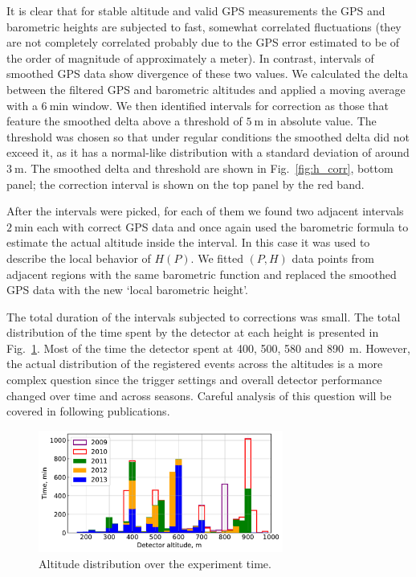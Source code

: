 \documentclass[universe,article,submit,moreauthors,pdftex]{Definitions/mdpi}
\begin{document}
It is clear that for stable altitude and valid GPS measurements the GPS and barometric heights are subjected to fast, somewhat correlated fluctuations (they are not completely correlated probably due to the GPS error estimated to be of the order of magnitude of approximately a meter). In contrast, intervals of smoothed GPS data show divergence of these two values. We calculated the delta between the filtered GPS and barometric altitudes and applied a moving average with a $6~\textrm{min}$ window. We then identified intervals for correction as those that feature the smoothed delta above a threshold of $5~\textrm{m}$ in absolute value. The threshold was chosen so that  under regular conditions the smoothed delta did not exceed it, as it has a normal-like distribution with a standard deviation of around $3~\textrm{m}$. The smoothed delta and threshold are shown in Fig.~\ref{fig:h_corr}, bottom panel; the correction interval is shown on the top panel by the red band.

After the intervals were picked, for each of them we found two adjacent intervals $2~\textrm{min}$ each with correct GPS data and once again used the barometric formula to estimate the actual altitude inside the interval. In this case it was used to describe the local behavior of $H(P)$. We fitted $(P, H)$ data points from adjacent regions with the same barometric function and replaced the smoothed GPS data with the new `local barometric height'.

The total duration of the intervals subjected to corrections was small. The total distribution of the time spent by the detector at each height is presented in Fig.~\ref{fig:time_on_altitude}. Most of the time the detector spent at 400, 500, 580 and 890~m. However, the actual distribution of the registered events across the altitudes is a more complex question since the trigger settings and overall detector performance changed over time and across seasons. Careful analysis of this question will be covered in following publications.

\begin{figure}[tb]
    \includegraphics[width=19pc]{figs/time_on_altitude_c.pdf}%
    \caption{Altitude distribution over the experiment time.}
    \label{fig:time_on_altitude}
\end{figure}
\end{document}
